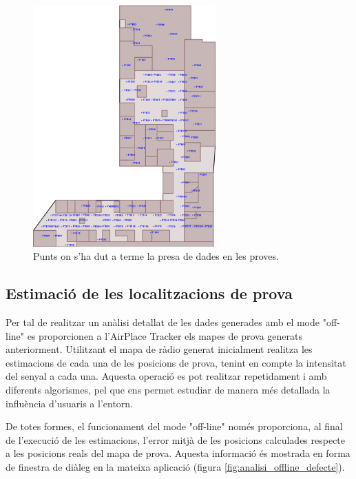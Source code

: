 \begin{figure}[ht]
\begin{center}
\includegraphics[width=7cm]{imatges/planol_proves.png}
\caption{Punts on s'ha dut a terme la presa de dades en les proves.}
\label{fig:planol_proves}
\end{center}
\end{figure}

\subsection{Estimació de les localitzacions de prova}

Per tal de realitzar un anàlisi detallat de les dades generades amb el mode "off-line" es proporcionen a l'AirPlace Tracker els mapes de prova generats anteriorment. Utilitzant el mapa de ràdio generat inicialment realitza les estimacions de cada una de les posicions de prova, tenint en compte la intensitat del senyal a cada una. Aquesta operació es pot realitzar repetidament i amb diferents algorismes, pel que ens permet estudiar de manera més detallada la influència d'usuaris a l'entorn.

De totes formes, el funcionament del mode "off-line" només proporciona, al final de l'execució de les estimacions, l'error mitjà de les posicions calculades respecte a les posicions reals del mapa de prova. Aquesta informació és mostrada en forma de finestra de diàleg en la mateixa aplicació (figura \ref{fig:analisi_offline_defecte}).

